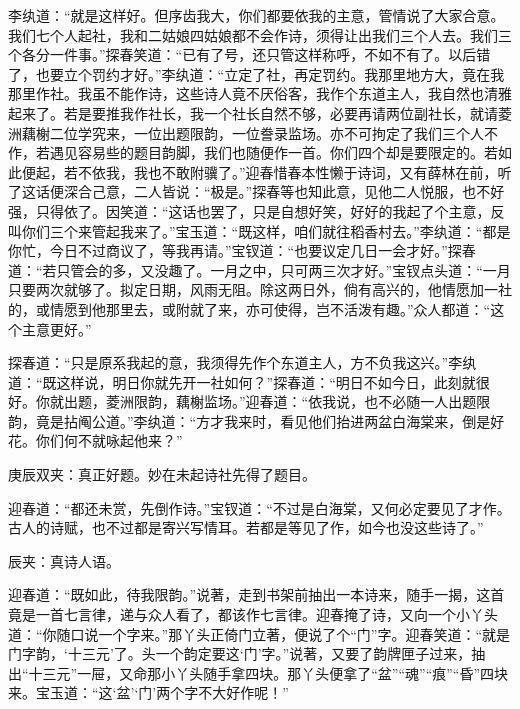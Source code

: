 \begin{parag}
\end{parag}


\begin{parag}
    李纨道：“就是这样好。但序齿我大，你们都要依我的主意，管情说了大家合意。我们七个人起社，我和二姑娘四姑娘都不会作诗，须得让出我们三个人去。我们三个各分一件事。”探春笑道：“已有了号，还只管这样称呼，不如不有了。以后错了，也要立个罚约才好。”李纨道：“立定了社，再定罚约。我那里地方大，竟在我那里作社。我虽不能作诗，这些诗人竟不厌俗客，我作个东道主人，我自然也清雅起来了。若是要推我作社长，我一个社长自然不够，必要再请两位副社长，就请菱洲藕榭二位学究来，一位出题限韵，一位誊录监场。亦不可拘定了我们三个人不作，若遇见容易些的题目韵脚，我们也随便作一首。你们四个却是要限定的。若如此便起，若不依我，我也不敢附骥了。”迎春惜春本性懒于诗词，又有薛林在前，听了这话便深合己意，二人皆说：“极是。”探春等也知此意，见他二人悦服，也不好强，只得依了。因笑道：“这话也罢了，只是自想好笑，好好的我起了个主意，反叫你们三个来管起我来了。”宝玉道：“既这样，咱们就往稻香村去。”李纨道：“都是你忙，今日不过商议了，等我再请。”宝钗道：“也要议定几日一会才好。”探春道：“若只管会的多，又没趣了。一月之中，只可两三次才好。”宝钗点头道：“一月只要两次就够了。拟定日期，风雨无阻。除这两日外，倘有高兴的，他情愿加一社的，或情愿到他那里去，或附就了来，亦可使得，岂不活泼有趣。”众人都道：“这个主意更好。”
\end{parag}


\begin{parag}
    探春道：“只是原系我起的意，我须得先作个东道主人，方不负我这兴。”李纨道：“既这样说，明日你就先开一社如何？”探春道：“明日不如今日，此刻就很好。你就出题，菱洲限韵，藕榭监场。”迎春道：“依我说，也不必随一人出题限韵，竟是拈阄公道。”李纨道：“方才我来时，看见他们抬进两盆白海棠来，倒是好花。你们何不就咏起他来？”\begin{note}庚辰双夹：真正好题。妙在未起诗社先得了题目。\end{note}迎春道：“都还未赏，先倒作诗。”宝钗道：“不过是白海棠，又何必定要见了才作。古人的诗赋，也不过都是寄兴写情耳。若都是等见了作，如今也没这些诗了。”\begin{note}辰夹：真诗人语。\end{note}迎春道：“既如此，待我限韵。”说著，走到书架前抽出一本诗来，随手一揭，这首竟是一首七言律，递与众人看了，都该作七言律。迎春掩了诗，又向一个小丫头道：“你随口说一个字来。”那丫头正倚门立著，便说了个“门”字。迎春笑道：“就是门字韵，‘十三元’了。头一个韵定要这‘门’字。”说著，又要了韵牌匣子过来，抽出“十三元”一屉，又命那小丫头随手拿四块。那丫头便拿了“盆”“魂”“痕”“昏”四块来。宝玉道：“这‘盆’‘门’两个字不大好作呢！”
\end{parag}


